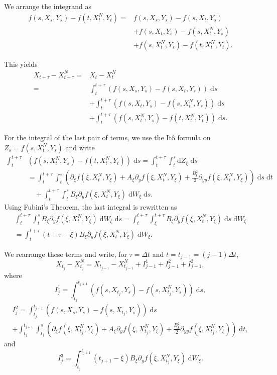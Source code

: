 \documentclass[reqno,12pt]{amsart}
\theoremstyle{plain}%
\theoremstyle{definition}
\begin{document}
We arrange the integrand as
\begin{align*}
f(s, X_s, Y_s) - f(t, X_t^N, Y_t) = & f(s, X_s, Y_s) - f(s, X_t, Y_s) \\ 
 & + f(s, X_t, Y_s) - f(s, X_t^N, Y_s) \\
 & + f(s, X_t^N, Y_s) - f(t, X_t^N, Y_t).
\end{align*}

This yields
\begin{align*}
X_{t + \tau} - X_{t + \tau}^N  = & X_t - X_t^N \\
= &  \int_t^{t + \tau} \left( f(s, X_s, Y_s) - f(s, X_t, Y_s) \right)\;\mathrm{d}s \\ 
 & + \int_t^{t + \tau} \left( f(s, X_t, Y_s) - f(s, X_t^N, Y_s) \right)\;\mathrm{d}s \\
 & + \int_t^{t + \tau} \left( f(s, X_t^N, Y_s) - f(t, X_t^N, Y_t) \right)\;\mathrm{d}s.
\end{align*}

For the integral of the last pair of terms, we use the It\^o formula on $Z_s = f(s, X_t^N, Y_s)$ and write
\begin{align*}
\int_t^{t + \tau} & \left(f(s, X_t^N, Y_s) - f(t, X_t^N, Y_t) \right)\;\mathrm{d}s  = \int_t^{t + \tau} \int_t^s \mathrm{d}Z_\xi \;\mathrm{d}s \\
& = \int_t^{t + \tau} \int_t^s \left(\partial_\xi f(\xi, X_t^N, Y_\xi) + A_\xi \partial_y f(\xi, X_t^N, Y_\xi)  + \frac{B_\xi^2}{2}\partial_{yy}f(\xi, X_t^N, Y_\xi) \right) \;\mathrm{d}s\;\mathrm{d}t \\ 
& \quad + \int_t^{t + \tau} \int_t^s B_\xi \partial_y f(\xi, X_t^N, Y_\xi)\;\mathrm{d}W_\xi\;\mathrm{d}s.
\end{align*}
Using Fubini's Theorem, the last integral is rewritten as
\begin{multline}
\label{fubini}
\int_t^{t + \tau} \int_t^s B_\xi \partial_y f(\xi, X_t^N, Y_\xi)\;\mathrm{d}W_\xi\;\mathrm{d}s 
  = \int_t^{t + \tau} \int_\xi^{t + \tau} B_\xi \partial_y f(\xi, X_t^N, Y_\xi) \;\mathrm{d}s \;\mathrm{d}W_\xi \\
  = \int_t^{t+\tau} (t + \tau - \xi) B_\xi \partial_y f(\xi, X_t^N, Y_\xi) \;\mathrm{d}W_\xi.
\end{multline}

We rearrange these terms and write, for $\tau = \Delta t$ and $t = t_{j-1} = (j-1)\Delta t$,
\begin{equation}
\label{stepexpression}
X_{t_j} - X_{t_j}^N  = X_{t_{j-1}} - X_{t_{j-1}}^N  + I_{j-1}^{1} + I_{j-1}^{2} + I_{j-1}^{3},
\end{equation}
where
$$
I_j^{1} = \int_{t_j}^{t_{j+1}} \left( f(s, X_{t_j}, Y_s) - f(s, X_{t_j}^N, Y_s) \right)\;\mathrm{d}s,
$$
\begin{multline*}
  I_j^2 =  \int_{t_j}^{t_{j+1}}  \left( f(s, X_s, Y_s) - f(s, X_{t_j}, Y_s) \right)\;\mathrm{d}s \\ 
 +  \int_{t_j}^{t_{j+1}} \int_{t_j}^s \left(\partial_\xi f(\xi, X_{t_j}^N, Y_\xi) + A_\xi \partial_y f(\xi, X_{t_j}^N, Y_\xi)  + \frac{B_\xi^2}{2}\partial_{yy}f(\xi, X_{t_j}^N, Y_\xi) \right) \;\mathrm{d}t,
\end{multline*}
and
$$
I_j^3 = \int_{t_j}^{t_{j+1}}  (t_{j+1} - \xi) B_\xi \partial_y f(\xi, X_{t_j}^N, Y_\xi) \;\mathrm{d}W_\xi.
$$
\end{document}
